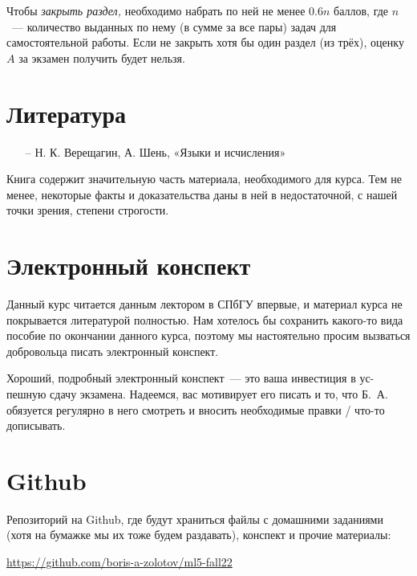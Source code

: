 \documentclass[a4paper,12pt]{article}
\begin{document}
	Чтобы {\it закрыть раздел,} необходимо набрать по ней не менее \(0.6 n\) баллов, где \(n\)~— количество выданных по нему (в сумме за все пары) задач для самостоятельной работы. Если не закрыть хотя бы один раздел (из трёх), оценку \(A\) за экзамен получить будет нельзя.

\section{Литература}

\begin{enumerate}
	\item[–] Н. К. Верещагин, А. Шень, «Языки и исчисления»
\end{enumerate}

	Книга содержит значительную часть материала, необходимого для курса. Тем не менее, некоторые факты и доказательства даны в ней в недостаточной, с нашей точки зрения, степени строгости.

\section{Электронный конспект}

	Данный курс читается данным лектором в СПбГУ впервые, и материал курса не покрывается литературой полностью. Нам хотелось бы сохранить какого-то вида пособие по окончании данного курса, поэтому мы настоятельно просим вызваться добровольца писать электронный конспект.

	Хороший, подробный электронный конспект~— это ваша инвестиция в ус-\linebreak пешную сдачу экзамена. Надеемся, вас мотивирует его писать и то, что Б.~А. обязуется регулярно в него смотреть и вносить необходимые правки / что-то дописывать.

\section{Github}

	Репозиторий на Github, где будут храниться файлы с домашними заданиями (хотя на бумажке мы их тоже будем раздавать), конспект и прочие материалы:

  \begin{center}
	\url{https://github.com/boris-a-zolotov/ml5-fall22}
  \end{center}
\end{document}
